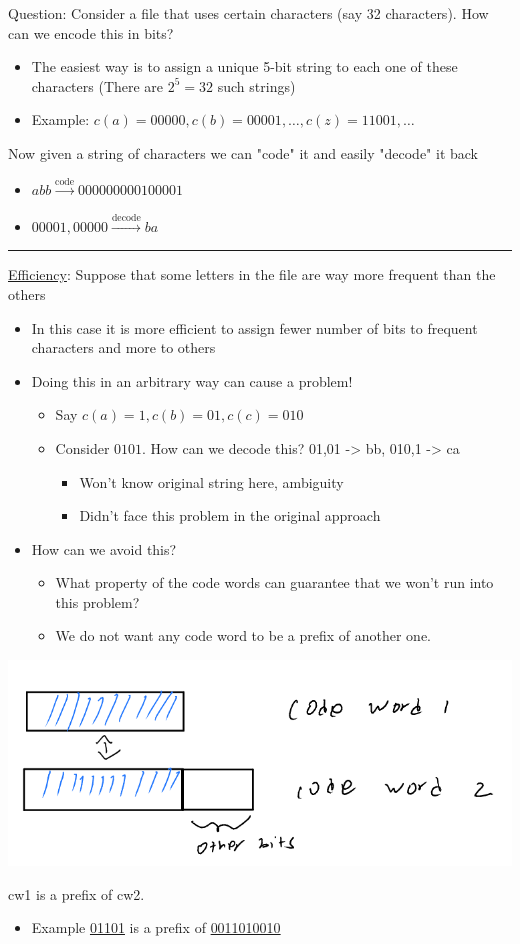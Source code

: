 \documentclass[11pt]{article}
\begin{document}
Question: Consider a file that uses certain characters (say 32 characters). How can we encode this in bits?
\begin{itemize}
\item The easiest way is to assign a unique 5-bit string to each one of these characters (There are \(2^{5}=32\) such strings)
\item Example: \(c(a)=00000, c(b)=00001, \ldots , c(z)=11001, \ldots\)
\end{itemize}
Now given a string of characters we can "code" it and easily "decode" it back
\begin{itemize}
\item \(abb \stackrel{\text{code}}{\rightarrow} 000000000100001\)
\item \(00001,00000 \stackrel{\text{decode}}{\rightarrow} ba\)
\end{itemize}

\noindent\rule{\textwidth}{0.5pt}
\uline{Efficiency}: Suppose that some letters in the file are way more frequent than the others
\begin{itemize}
\item In this case it is more efficient to assign fewer number of bits to frequent characters and more to others
\item Doing this in an arbitrary way can cause a problem!
\begin{itemize}
\item Say \(c(a)=1, c(b)=01, c(c)=010\)
\item Consider \(0101\). How can we decode this? 01,01 -> bb, 010,1 -> ca
\begin{itemize}
\item Won't know original string here, ambiguity
\item Didn't face this problem in the original approach
\end{itemize}
\end{itemize}
\item How can we avoid this?
\begin{itemize}
\item What property of the code words can guarantee that we won't run into this problem?
\item We do not want any code word to be a prefix of another one.
\end{itemize}
\end{itemize}
\begin{center}
\includegraphics[width=.9\linewidth]{./Images/i60.png}
\end{center}
cw1 is a prefix of cw2.
\begin{itemize}
\item Example \uline{01101} is a prefix of \uline{0011010010}
\end{itemize}
\end{document}
